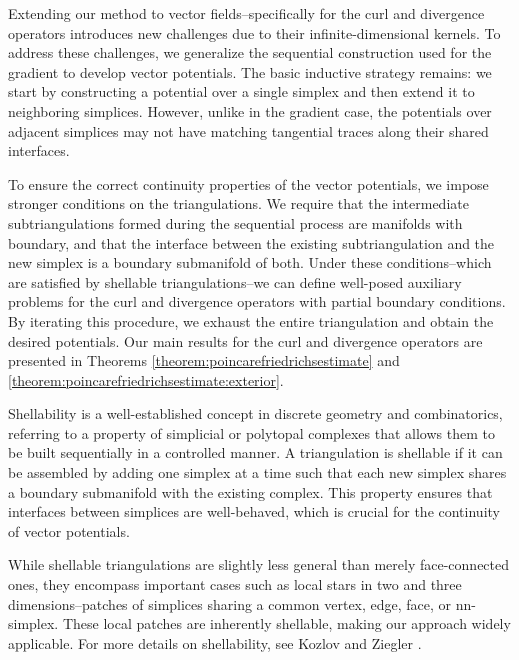 





Extending our method to vector fields--specifically for the curl and divergence operators introduces new challenges due to their infinite-dimensional kernels. 
To address these challenges, we generalize the sequential construction used for the gradient to develop vector potentials. 
The basic inductive strategy remains: 
we start by constructing a potential over a single simplex and then extend it to neighboring simplices. 
However, unlike in the gradient case, the potentials over adjacent simplices may not have matching tangential traces along their shared interfaces.

To ensure the correct continuity properties of the vector potentials, we impose stronger conditions on the triangulations. We require that the intermediate subtriangulations formed during the sequential process are manifolds with boundary, and that the interface between the existing subtriangulation and the new simplex is a boundary submanifold of both. Under these conditions--which are satisfied by shellable triangulations--we can define well-posed auxiliary problems for the curl and divergence operators with partial boundary conditions. By iterating this procedure, we exhaust the entire triangulation and obtain the desired potentials. Our main results for the curl and divergence operators are presented in Theorems \ref{theorem:poincarefriedrichsestimate} and \ref{theorem:poincarefriedrichsestimate:exterior}.

Shellability is a well-established concept in discrete geometry and combinatorics, referring to a property of simplicial or polytopal complexes that allows them to be built sequentially in a controlled manner. A triangulation is shellable if it can be assembled by adding one simplex at a time such that each new simplex shares a boundary submanifold with the existing complex. This property ensures that interfaces between simplices are well-behaved, which is crucial for the continuity of vector potentials.

While shellable triangulations are slightly less general than merely face-connected ones, they encompass important cases such as local stars in two and three dimensions--patches of simplices sharing a common vertex, edge, face, or nn-simplex. These local patches are inherently shellable, making our approach widely applicable. For more details on shellability, see Kozlov \cite{kozlov2008combinatorial} and Ziegler \cite{ziegler1995lectures}.


